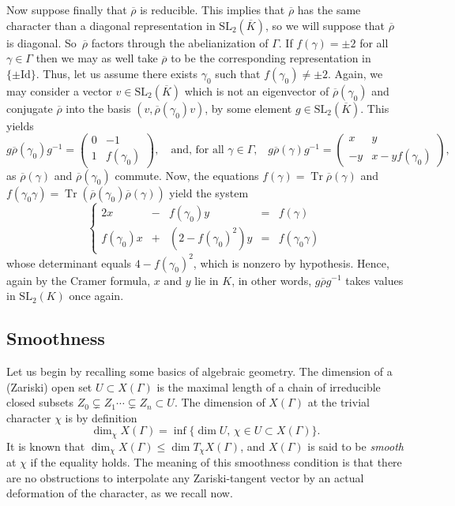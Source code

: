 \documentclass[JEP,XML,SOM,Unicode,NoEqCountersInSection]{cedram}
\theoremstyle{definition}
\newcommand{\tr}{\operatorname{Tr}}
\newcommand{\SL}{\mathrm{SL}}
\newcommand{\id}{\mathrm{Id}}
\begin{document}
Now suppose finally that $\overline{\rho}$ is reducible. This implies that
$\overline{\rho}$ has the same character than a diagonal representation in
$\SL_2(\overline{K})$, so we will suppose that $\overline{\rho}$ is diagonal.
So~$\overline{\rho}$ factors through the abelianization of $\Gamma$.
If $f(\gamma)=\pm 2$ for all $\gamma\in\Gamma$ then we may as well take
$\overline{\rho}$ to be the corresponding representation in
$\lbrace\pm \id\rbrace$. Thus, let us assume there exists $\gamma_0$ such
that $f(\gamma_0)\neq \pm 2$. Again, we may consider a vector
$v\in\SL_2(\overline{K})$ which is not an eigenvector of
$\overline{\rho}(\gamma_0)$ and conjugate $\overline{\rho}$ into the basis
$(v,\overline{\rho}(\gamma_0)v)$, by some element $g\in\SL_2(\overline{K})$.
This yields
\[
g\overline{\rho}(\gamma_0)g^{-1}=
\begin{pmatrix}0 & -1 \\ 1 & f(\gamma_0)\end{pmatrix},\quad\text{
and, for all $\gamma\in\Gamma$,}\quad
g\overline{\rho}(\gamma)g^{-1}=
\begin{pmatrix}x & y \\ -y & x-yf(\gamma_0)\end{pmatrix},
\]
as $\overline{\rho}(\gamma)$ and $\overline{\rho}(\gamma_0)$ commute.
Now, the equations $f(\gamma)=\tr \overline{\rho}(\gamma)$ and
$f(\gamma_0\gamma)=\tr(\overline{\rho}(\gamma_0)\overline{\rho}(\gamma))$
yield the system
\[ \left\lbrace\begin{array}{rcrcl}2x &-& f(\gamma_0)y &=& f(\gamma) \\
f(\gamma_0)x&+&(2-f(\gamma_0)^2)y &=& f(\gamma_0\gamma)\end{array}\right. \]
whose determinant equals $4-f(\gamma_0)^2$, which is nonzero by hypothesis.
Hence, again by the Cramer formula, $x$ and $y$ lie in $K$, in other
words, $g\overline{\rho} g^{-1}$ takes values in $\SL_2(K)$ once again.

\subsection{Smoothness}

Let us begin by recalling some basics of algebraic geometry.
The dimension of a (Zariski) open set $U\subset X(\Gamma)$ is the maximal
length of a chain of irreducible closed subsets
$Z_0\subsetneq Z_1\cdots \subsetneq Z_n \subset U$.
The dimension of $X(\Gamma)$ at the trivial character $\chi$ is by definition
\[ \dim_\chi X(\Gamma)=\inf \{\dim U,\, \chi\in U \subset X(\Gamma)\}. \]
It is known that $\dim_\chi X(\Gamma)\leq \dim T_\chi X(\Gamma)$, and
$X(\Gamma)$ is said to be {\em smooth} at $\chi$ if the equality holds.
The meaning of this smoothness condition is that there are no obstructions
to interpolate any Zariski-tangent vector by an actual deformation of the
character, as we recall now.
\end{document}
